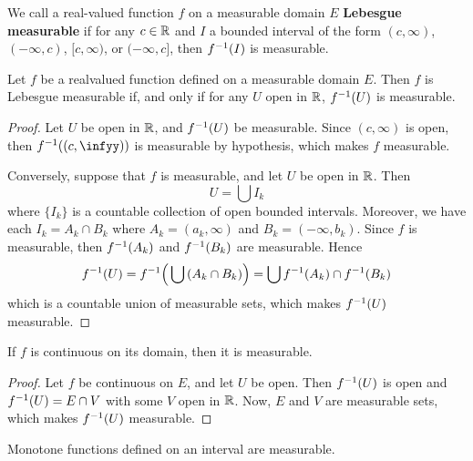 \begin{definition}
    We call a real-valued function $f$ on a measurable domain $E$
    \textbf{Lebesgue measurable} if for any $c \in \mathbb{R}$ and $I$ a bounded
    interval of the form  $(c,\infty)$, $(-\infty,c)$, $[c,\infty)$, or
    $(-\infty,c]$, then $f^{-1}(I)$ is measurable.
\end{definition}

\begin{lemma}\label{9.1.2}
    Let $f$ be a realvalued function defined on a measurable domain  $E$. Then
    $f$ is Lebesgue measurable if, and only if for any  $U$ open in $\mathbb{R}$,
    $f^{-1}(U)$ is measurable.
\end{lemma}
\begin{proof}
    Let $U$ be open in  $\mathbb{R}$, and $f^{-1}(U)$ be measurable. Since $(c,\infty)$
    is open, then $\inv{f}((c,\infyy))$ is measurable by hypothesis, which makes
    $f$ measurable.

    Conversely, suppose that $f$ is measurable, and let  $U$ be open in  $\mathbb{R}$.
    Then
    \begin{equation*}
        U=\bigcup{I_k}
    \end{equation*}
    where $\{I_k\}$ is a countable collection of open bounded intervals.
    Moreover, we have each $I_k=A_k \cap B_k$ where  $A_k=(a_k,\infty)$ and
    $B_k=(-\infty,b_k)$. Since $f$ is measurable, then  $f^{-1}(A_k)$ and
    $f^{-1}(B_k)$ are measurable. Hence
    \begin{equation*}
        f^{-1}(U)=f^{-1}\Big{(} \bigcup{(A_k \cap B_k)} \Big{)}=
        \bigcup{f^{-1}(A_k) \cap f^{-1}(B_k)}
    \end{equation*}
    which is a countable union of measurable sets, which makes $f^{-1}(U)$
    measurable.
\end{proof}
\begin{corollary}
    If $f$ is continuous on its domain, then it is measurable.
\end{corollary}
\begin{proof}
    Let $f$ be continuous on $E$, and let $U$ be open. Then  $f^{-1}(U)$ is
    open and $f^{-1}(U)=E \cap V$ with some $V$ open in  $\mathbb{R}$. Now, $E$ and $V$
    are measurable sets, which makes  $f^{-1}(U)$ measurable.
\end{proof}

\begin{lemma}\label{9.1.3}
    Monotone functions defined on an interval are measurable.
\end{lemma}

